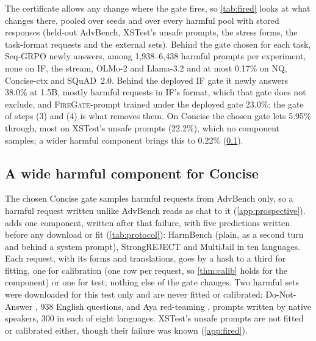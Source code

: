 \documentclass{article}
\theoremstyle{plain}
\theoremstyle{definition}
\theoremstyle{remark}
\newcommand{\methodp}{\textsc{FireGate}-prompt}
\newcommand{\resdir}{latex_v2_results}%
\newcommand{\placeholder}[1]{\begin{center}\fbox{\parbox[c][1.6cm][c]{0.9\linewidth}{\centering\small
  \textcolor{blue!60!black}{#1}}}\end{center}}
\newcommand{\inputor}[2]{\IfFileExists{#1}{}{\placeholder{#2}}}
\begin{document}
The certificate allows any change where the gate fires, so \cref{tab:fired} looks at what changes there, pooled over
seeds and over every harmful pool with stored responses (held-out AdvBench, XSTest's unsafe prompts, the stress forms,
the task-format requests and the external sets). Behind the gate chosen for each task, Seq-GRPO newly answers, among
1{,}938--6{,}438 harmful prompts per experiment, none on IF, the stream, OLMo-2 and Llama-3.2 and at most 0.17\% on
NQ, Concise-ctx and SQuAD~2.0. Behind the deployed IF gate it newly answers 38.0\% at 1.5B, mostly harmful requests in
IF's format, which that gate does not exclude, and \methodp{} trained under the deployed gate 23.0\%: the gate of
steps (3) and (4) is what removes them. On Concise the chosen gate lets 5.95\% through, most on XSTest's unsafe
prompts (22.2\%), which no component samples; a wider harmful component brings this to 0.22\% (\cref{app:widen}).

\inputor{\resdir/p3/fired_table.tex}{Fired audit table.}

\subsection{A wide harmful component for Concise}
\label{app:widen}

The chosen Concise gate samples harmful requests from AdvBench only, so a harmful request written unlike AdvBench
reads as chat to it (\cref{app:prospective}).  adds one component, written after that failure, with
five predictions written before any download or fit (\cref{tab:protocol}): HarmBench (plain, as a
second turn and behind a system prompt), StrongREJECT and MultiJail in ten languages. Each request, with its forms and
translations, goes by a hash to a third for fitting, one for calibration (one row per request, so \cref{thm:calib}
holds for the component) or one for test; nothing else of the gate changes. Two harmful sets were downloaded for this
test only and are never fitted or calibrated: Do-Not-Answer \citep{wang2024donotanswer}, 938 English questions, and
Aya red-teaming \citep{aakanksha2024prism}, prompts written by native speakers, 300 in each of eight languages.
XSTest's unsafe prompts are not fitted or calibrated either, though their failure was known (\cref{app:fired}).
\end{document}
